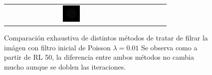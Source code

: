 \documentclass{./packages/optica-article}
\begin{document}
\begin{figure}[hbp]
\begin{center}
\begin{tabular}{c c | c c c}
			\includegraphics[width=0.13\textwidth]{Simulation deconvolution/ref_np_0.01/RL_50_mins_RL_100}
		\end{tabular}
		\caption{Comparación exhaustiva de distintos métodos de tratar de filrar la imágen con filtro inicial de Poisson $\lambda = 0.01$ Se observa como a partir de RL 50, la diferencia entre ambos métodos no cambia mucho aunque se doblen las iteraciones. }\label{fig:filtros:comparacion}
	\end{center}
\end{figure}

\end{document}
